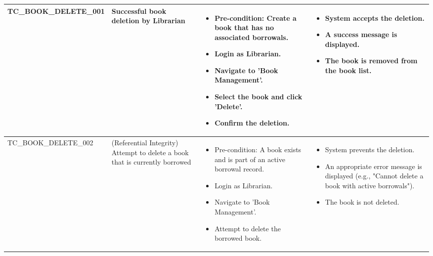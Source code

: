 \begin{longtable}{|>{\scriptsize\raggedright\arraybackslash}p{4.2cm}|>{\raggedright\arraybackslash}p{3.5cm}|>{\raggedright\arraybackslash}p{3.5cm}|>{\raggedright\arraybackslash}p{3.8cm}|}
TC\_BOOK\_DELETE\_001 & Successful book deletion by Librarian & 
    \begin{itemize}[noitemsep, topsep=0pt, partopsep=0pt, leftmargin=*]
        \item Pre-condition: Create a book that has no associated borrowals.
        \item Login as Librarian.
        \item Navigate to 'Book Management'.
        \item Select the book and click 'Delete'.
        \item Confirm the deletion.
    \end{itemize} & 
    \begin{itemize}[noitemsep, topsep=0pt, partopsep=0pt, leftmargin=*]
        \item System accepts the deletion.
        \item A success message is displayed.
        \item The book is removed from the book list.
    \end{itemize} \\ \hline
TC\_BOOK\_DELETE\_002 & (Referential Integrity) Attempt to delete a book that is currently borrowed & 
    \begin{itemize}[noitemsep, topsep=0pt, partopsep=0pt, leftmargin=*]
        \item Pre-condition: A book exists and is part of an active borrowal record.
        \item Login as Librarian.
        \item Navigate to 'Book Management'.
        \item Attempt to delete the borrowed book.
    \end{itemize} & 
    \begin{itemize}[noitemsep, topsep=0pt, partopsep=0pt, leftmargin=*]
        \item System prevents the deletion.
        \item An appropriate error message is displayed (e.g., "Cannot delete a book with active borrowals").
        \item The book is not deleted.
    \end{itemize} \\ \hline


\end{longtable}
